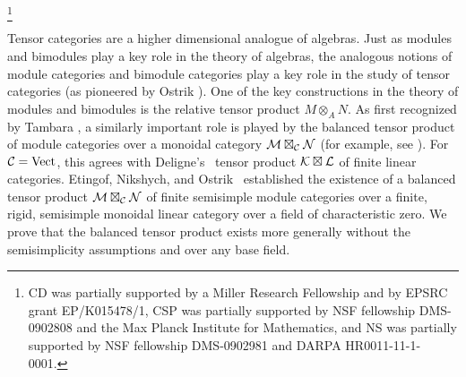 \documentclass{amsart}
\begin{document}
\thanks{CD was partially supported by a Miller Research Fellowship and by EPSRC grant EP/K015478/1, CSP was partially supported by NSF fellowship DMS-0902808 and the Max Planck Institute for Mathematics, and NS was partially supported by NSF fellowship DMS-0902981 and DARPA HR0011-11-1-0001.
}


\maketitle	

\tikzexternaldisable


Tensor categories are a higher dimensional analogue of algebras.  Just as modules and bimodules play a key role in the theory of algebras, the analogous notions of module categories and bimodule categories play a key role in the study of tensor categories (as pioneered by Ostrik \cite{MR1976459}).  One of the key constructions in the theory of modules and bimodules is the relative tensor product $M \otimes_A N$.  As first recognized by Tambara \cite{tambara}, a similarly important role is played by the balanced tensor product of module categories over a monoidal category $\mathcal M \boxtimes_\mathcal C \mathcal N$ (for example, see \cite{MR1966524, 0909.3140, MR2511638, MR2909758, 1202.4396, MR3022755, MR3063919}).  For $\mathcal C = \mathrm{Vect}$, this agrees with Deligne's~\cite{MR1106898} tensor product $\mathcal K \boxtimes \mathcal L$ of finite linear categories.  Etingof, Nikshych, and Ostrik~\cite{0909.3140} established the existence of a balanced tensor product $\mathcal M \boxtimes_{\mathcal C} \mathcal N$ of finite semisimple module categories over a finite, rigid, semisimple monoidal linear category over a field of characteristic zero.  We prove that the balanced tensor product exists more generally without the semisimplicity assumptions and over any base field.
\end{document}
